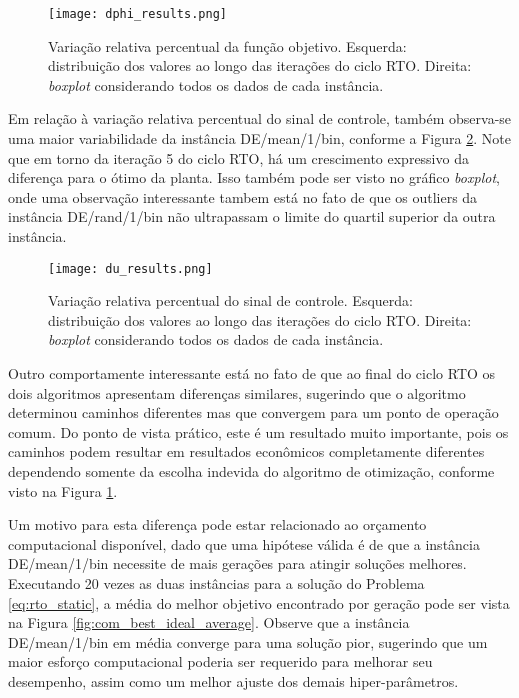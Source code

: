 \documentclass[conference]{IEEEtran}
\begin{document}
\begin{figure}[h!]
	\centering
	\texttt{[image: dphi\_results.png]}
	\caption{Variação relativa percentual da função objetivo. Esquerda: distribuição dos valores ao longo das iterações do ciclo RTO. Direita: \textit{boxplot} considerando todos os dados de cada instância.}
	\label{fig:dphi_results}
\end{figure}

Em relação à variação relativa percentual do sinal de controle, também observa-se uma maior variabilidade da instância DE/mean/1/bin, conforme a Figura \ref{fig:du_results}. Note que em torno da iteração 5 do ciclo RTO, há um crescimento expressivo da diferença para o ótimo da planta. Isso também pode ser visto no gráfico \textit{boxplot}, onde uma observação interessante tambem está no fato de que os outliers da instância DE/rand/1/bin não ultrapassam o limite do quartil superior da outra instância.

\begin{figure}[h!]
	\centering
	\texttt{[image: du\_results.png]}
	\caption{Variação relativa percentual do sinal de controle. Esquerda: distribuição dos valores ao longo das iterações do ciclo RTO. Direita: \textit{boxplot} considerando todos os dados de cada instância.}
	\label{fig:du_results}
\end{figure}

Outro comportamente interessante está no fato de que ao final do ciclo RTO os dois algoritmos apresentam diferenças similares, sugerindo que o algoritmo determinou caminhos diferentes mas que convergem para um ponto de operação comum. Do ponto de vista prático, este é um resultado muito importante, pois os caminhos podem resultar em resultados econômicos completamente diferentes dependendo somente da escolha indevida do algoritmo de otimização, conforme visto na Figura \ref{fig:dphi_results}. 



Um motivo para esta diferença pode estar relacionado ao orçamento computacional disponível, dado que uma hipótese válida é de que a instância DE/mean/1/bin necessite de mais gerações para atingir soluções melhores. Executando 20 vezes as duas instâncias para a solução do Problema \ref{eq:rto_static}, a média do melhor objetivo encontrado por geração pode ser vista na Figura \ref{fig:com_best_ideal_average}. Observe que a instância DE/mean/1/bin em média converge para uma solução pior, sugerindo que um maior esforço computacional poderia ser requerido para melhorar seu desempenho, assim como um melhor ajuste dos demais hiper-parâmetros. 
\end{document}
